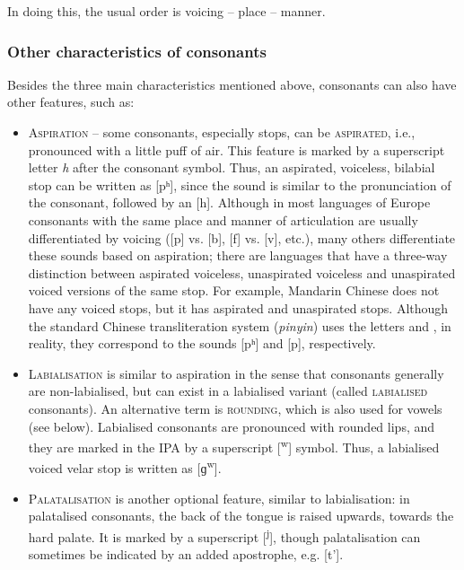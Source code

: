 \begin{refsection}
In doing this, the usual order is voicing -- place -- manner.

\subsubsection{Other characteristics of consonants}

Besides the three main characteristics mentioned above, consonants can also have other features, such as:

\begin{itemize}
    \sloppy
    \item \textsc{Aspiration} – some consonants, especially stops, can be \textsc{aspirated}, i.e., pronounced with a little puff of air. This feature is marked by a superscript letter \textit{h} after the consonant symbol. Thus, an aspirated, voiceless, bilabial stop can be written as [{pʰ}], since the sound is similar to the pronunciation of the consonant, followed by an [h]. Although in most languages of Europe consonants with the same place and manner of articulation are usually differentiated by voicing ([{p}] vs. [{b}], [{f}] vs. [{v}], etc.), many others differentiate these sounds based on aspiration; there are languages that have a three-way distinction between aspirated voiceless, unaspirated voiceless and unaspirated voiced versions of the same stop. For example, Mandarin Chinese does not have any voiced stops, but it has aspirated and unaspirated stops. Although the standard Chinese transliteration system (\textit{pinyin}) uses the letters  and , in reality, they correspond to the sounds [{pʰ}] and [{p}], respectively.
    \item \textsc{Labialisation} is similar to aspiration in the sense that consonants generally are non-labialised, but can exist in a labialised variant (called \textsc{labialised} consonants). An alternative term is \textsc{rounding}, which is also used for vowels (see below). Labialised consonants are pronounced with rounded lips, and they are marked in the IPA by a superscript [\textsuperscript{w}] symbol. Thus, a labialised voiced velar stop is written as [{ɡ\textsuperscript{w}}].
    \item \textsc{Palatalisation} is another optional feature, similar to labialisation: in pa\-la\-ta\-lised consonants, the back of the tongue is raised upwards, towards the hard palate. It is marked by a superscript [\textsuperscript{j}], though palatalisation can sometimes be indicated by an added apostrophe, e.g. [t'].
\end{itemize}


\end{refsection}
